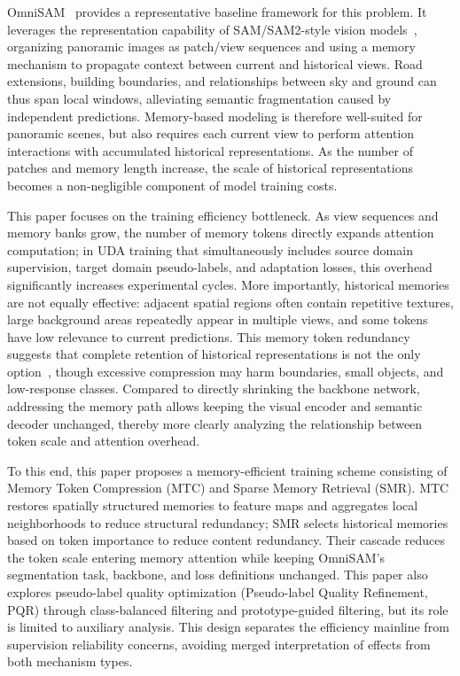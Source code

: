 OmniSAM~\cite{zhong2025omnisam} provides a representative baseline framework for this problem. It leverages the representation capability of SAM/SAM2-style vision models~\cite{kirillov2023segment,ravi2025sam2}, organizing panoramic images as patch/view sequences and using a memory mechanism to propagate context between current and historical views. Road extensions, building boundaries, and relationships between sky and ground can thus span local windows, alleviating semantic fragmentation caused by independent predictions. Memory-based modeling is therefore well-suited for panoramic scenes, but also requires each current view to perform attention interactions with accumulated historical representations. As the number of patches and memory length increase, the scale of historical representations becomes a non-negligible component of model training costs.

This paper focuses on the training efficiency bottleneck. As view sequences and memory banks grow, the number of memory tokens directly expands attention computation; in UDA training that simultaneously includes source domain supervision, target domain pseudo-labels, and adaptation losses, this overhead significantly increases experimental cycles. More importantly, historical memories are not equally effective: adjacent spatial regions often contain repetitive textures, large background areas repeatedly appear in multiple views, and some tokens have low relevance to current predictions. This memory token redundancy suggests that complete retention of historical representations is not the only option~\cite{rao2021dynamicvit,bolya2023tome,lu2023tokensharing}, though excessive compression may harm boundaries, small objects, and low-response classes. Compared to directly shrinking the backbone network, addressing the memory path allows keeping the visual encoder and semantic decoder unchanged, thereby more clearly analyzing the relationship between token scale and attention overhead.

To this end, this paper proposes a memory-efficient training scheme consisting of Memory Token Compression (MTC) and Sparse Memory Retrieval (SMR). MTC restores spatially structured memories to feature maps and aggregates local neighborhoods to reduce structural redundancy; SMR selects historical memories based on token importance to reduce content redundancy. Their cascade reduces the token scale entering memory attention while keeping OmniSAM's segmentation task, backbone, and loss definitions unchanged. This paper also explores pseudo-label quality optimization (Pseudo-label Quality Refinement, PQR) through class-balanced filtering and prototype-guided filtering, but its role is limited to auxiliary analysis. This design separates the efficiency mainline from supervision reliability concerns, avoiding merged interpretation of effects from both mechanism types.

